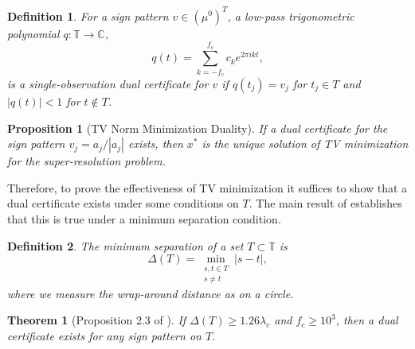 \documentclass[11pt]{article}
\newcommand{\TT}{\mathbb{T}}
\newcommand{\CC}{\mathbb{C}}
\newtheorem{theorem}{Theorem}
\newtheorem{definition}{Definition}
\newtheorem{proposition}{Proposition}
\begin{document}
\begin{definition}
    For a sign pattern $v \in (\mu^0)^T$, a low-pass trigonometric polynomial $q: \TT \to \CC$,
    \begin{equation}
        q(t) = \sum_{k = -f_c}^{f_c} c_k e^{2\pi i k t},
    \end{equation}
    is a \emph{single-observation dual certificate} for $v$ if $q(t_j) = v_j$ for $t_j \in T$ and $|q(t)| < 1$ for $t \notin T$.
\end{definition}
\begin{proposition}[\textsf{TV} Norm Minimization Duality]
If a dual certificate for the sign pattern $v_j = a_j / |a_j|$ exists, then $x^*$ is the unique solution of \textsf{TV} minimization for the super-resolution problem.
\end{proposition}
Therefore, to prove the effectiveness of \textsf{TV} minimization it suffices to show that a dual certificate exists under some conditions on $T$.
The main result of \cite{fernandez2016super} establishes that this is true under a minimum separation condition.
\begin{definition}
    The \emph{minimum separation} of a set $T \subset \TT$ is
    \[ \Delta(T) = \min_{\substack{s, t \in T \\ s \neq t}} | s - t |, \]
    where we measure the wrap-around distance as on a circle.
\end{definition}

\begin{theorem}[Proposition 2.3 of \cite{fernandez2016super}]
    If $\Delta(T) \geq 1.26\lambda_c$ and $f_c \geq 10^3$, then a dual certificate exists for any sign pattern on $T$.
    \label{thm:single-obs-recovery}
\end{theorem}
\end{document}
